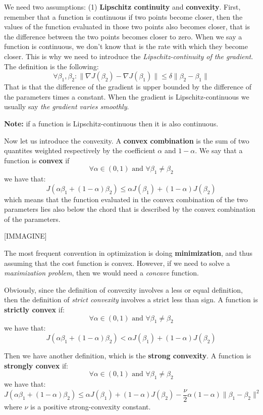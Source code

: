 We need two assumptions: (1) \textbf{Lipschitz continuity} and \textbf{convexity}.
First, remember that a function is continuous if two points become closer, then the values of the function evaluated in those two points also becomes closer, that is the difference between the two points becomes closer to zero. When we say a function is continuous, we don't know that is the rate with which they become closer. This is why we need to introduce the \textit{Lipschitz-continuity of the gradient}. The definition is the following:
\[
    \forall \beta_1, \beta_2 \colon \| \nabla J(\beta_2) - \nabla J(\beta_1)\| \leq \delta \|\beta_2 - \beta_1\|
\]
That is that the difference of the gradient is upper bounded by the difference of the parameters times a constant. When the gradient is Lipschitz-continuous we usually say \textit{the gradient varies smoothly}.

\textbf{Note:} if a function is Lipschitz-continuous then it is also continuous.

Now let us introduce the convexity. A \textbf{convex combination} is the sum of two quantites weighted respectively by the coefficient $\alpha$ and $1-\alpha$. We say that a function is \textbf{convex} if
\[
    \forall \alpha \in (0,1) \text{ and } \forall \beta_1 \neq \beta_2
\]
we have that:
\[
    J(\alpha \beta_1 + (1-\alpha)\beta_2) \leq \alpha J(\beta_1) + (1-\alpha)J(\beta_2)
\]
which means that the function evaluated in the convex combination of the two parameters lies also below the chord that is described by the convex combination of the parameters.

    [IMMAGINE]

The most frequent convention in optimization is doing \textbf{minimization}, and thus assuming that the cost function is convex. However, if we need to solve a \textit{maximization problem}, then we would need a \textit{concave} function.

Obviously, since the definition of convexity involves a less or equal definition, then the definition of \textit{strict convexity} involves a strict less than sign. A function is \textbf{strictly convex} if:
\[
    \forall \alpha \in (0,1) \text{ and } \forall \beta_1 \neq \beta_2
\]
we have that:
\[
    J(\alpha \beta_1 + (1-\alpha)\beta_2) < \alpha J(\beta_1) + (1-\alpha)J(\beta_2)
\]

Then we have another definition, which is the \textbf{strong convexity}. A function is \textbf{strongly convex} if:
\[
    \forall \alpha \in (0,1) \text{ and } \forall \beta_1 \neq \beta_2
\]
we have that:
\[
    J(\alpha \beta_1 + (1-\alpha)\beta_2) \leq \alpha J(\beta_1) + (1-\alpha)J(\beta_2) - \frac{\nu}{2} \alpha (1-\alpha) \| \beta_1 - \beta_2 \|^2
\]
where $\nu$ is a positive strong-convexity constant.


